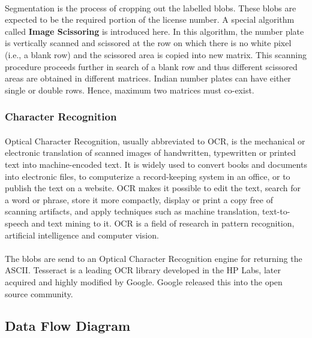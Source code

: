 \documentclass[a4paper,10pt]{iesreport}
\begin{document}
\paragraph*{}
Segmentation is the process of cropping out the labelled blobs. These blobs are expected to be the required portion of the license number. A special algorithm called \textbf{Image Scissoring} is introduced here. In this algorithm, the number plate is vertically scanned
 and scissored at the row on which there is no white
 pixel (i.e., a blank row) and the scissored area is
 copied into new matrix. This scanning procedure
 proceeds further in search of a blank row and thus
 different scissored areas are obtained in different
  matrices. Indian number plates can have either
 single or double rows. Hence, maximum two
 matrices must co-exist.

\subsubsection{Character Recognition}
\paragraph*{}
Optical Character Recognition, usually abbreviated to OCR, is the mechanical or electronic translation of scanned images of handwritten, typewritten or printed text into machine-encoded text. It is widely used to convert books and documents into electronic files, to computerize a record-keeping system in an office, or to publish the text on a website. OCR makes it possible to edit the text, search for a word or phrase, store it more compactly, display or print a copy free of scanning artifacts, and apply techniques such as machine translation, text-to-speech and text mining to it. OCR is a field of research in pattern recognition, artificial intelligence and computer vision.
\paragraph*{}
The blobs are send to an Optical Character Recognition
 engine for returning the ASCII.
Tesseract is a leading OCR library developed in the HP Labs,
 later acquired and highly modified by Google.
 Google released this into the open source community.
\newpage
\subsection{Data Flow Diagram}
\end{document}
